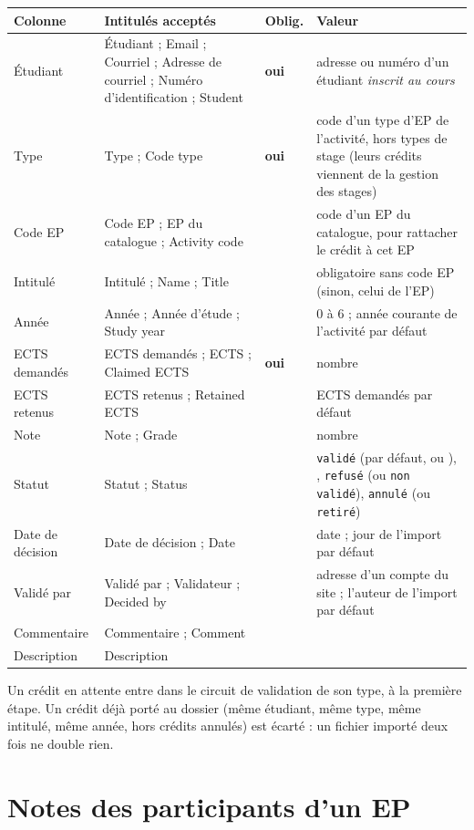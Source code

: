 \documentclass[11pt,a4paper]{article}
\newcommand{\code}[1]{\texttt{\detokenize{#1}}}
\newcommand{\col}[1]{\texttt{#1}}
\newcommand{\oblig}{\textbf{oui}}
\begin{document}
\begin{longtable}{@{}L{2.8cm}L{5cm}L{1.4cm}L{6cm}@{}}
\toprule
Colonne & Intitulés acceptés & Oblig. & Valeur \\
\midrule\endhead
Étudiant & Étudiant ; Email ; Courriel ; Adresse de courriel ; Numéro d'identification ;
  Student & \oblig & adresse ou numéro d'un étudiant \emph{inscrit au cours} \\
Type & Type ; Code type & \oblig & code d'un type d'EP de l'activité, hors types de stage
  (leurs crédits viennent de la gestion des stages) \\
Code EP & Code EP ; EP du catalogue ; Activity code & & code d'un EP du catalogue, pour
  rattacher le crédit à cet EP \\
Intitulé & Intitulé ; Name ; Title & & obligatoire sans code EP (sinon, celui de l'EP) \\
Année & Année ; Année d'étude ; Study year & & 0 à 6 ; année courante de l'activité par
  défaut \\
ECTS demandés & ECTS demandés ; ECTS ; Claimed ECTS & \oblig & nombre \\
ECTS retenus & ECTS retenus ; Retained ECTS & & ECTS demandés par défaut \\
Note & Note ; Grade & & nombre \\
Statut & Statut ; Status & & \col{validé} (par défaut, ou \code{acquis}), \code{en attente},
  \col{refusé} (ou \col{non validé}), \col{annulé} (ou \col{retiré}) \\
Date de décision & Date de décision ; Date & & date ; jour de l'import par défaut \\
Validé par & Validé par ; Validateur ; Decided by & & adresse d'un compte du site ; l'auteur de
  l'import par défaut \\
Commentaire & Commentaire ; Comment & & \\
Description & Description & & \\
\bottomrule
\end{longtable}

Un crédit en attente entre dans le circuit de validation de son type, à la première étape.
Un crédit déjà porté au dossier (même étudiant, même type, même intitulé, même année, hors
crédits annulés) est écarté : un fichier importé deux fois ne double rien.

\section{Notes des participants d'un EP}
\end{document}
